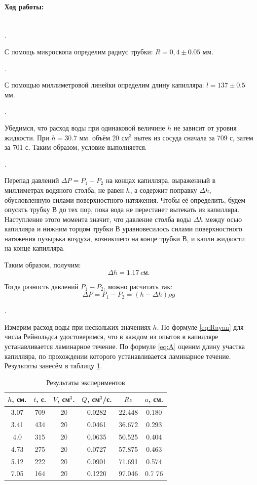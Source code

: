 \documentclass[a4paper, 12pt]{article}
\newcommand{\parag}[1]{\paragraph*{#1:}}
\newcounter{Points}
\newcommand{\point}{\arabic{Points}. \addtocounter{Points}{1}}
\begin{document}
\parag {Ход работы} ~\\

\point С помощь микроскопа определим радиус трубки: $R = 0,4 \pm 0.05$ мм.

\point С помощью миллиметровой линейки определим длину капилляра: $l = 137 \pm 0.5$ мм.

\point Убедимся, что расход воды при одинаковой величине $h$ не зависит от уровня жидкости. При $h = 30.7$ мм. объём 20 см$^3$ вытек из сосуда сначала за 709 с, затем за 701 с. Таким образом, условие выполняется.

\point Перепад давлений $\Delta P = P_1 - P_2$ на концах капилляра, выраженный в миллиметрах водяного столба, не равен $h$, а содержит поправку $\Delta h$, обусловленную силами поверхностного натяжения. Чтобы её определить, будем опускть трубку $В$ до тех пор, пока вода не перестанет вытекать из капилляра. Наступление этого момента значит, что давление столба воды $\Delta h$ между осью капилляра и нижним торцом трубки $В$ уравновесилось силами поверхностного натяжения пузырька воздуха, возникшего на конце трубки $В$, и капли жидкости на конце капилляра.

Таким образом, получим:
\begin{equation*}
    \Delta h = 1.17~cм.
\end{equation*}

Тогда разность давлений $P_1 - P_2$, можно расчитать так:
\begin{equation}
    \Delta P = P_1 - P_2 = (h - \Delta h)\rho g
    \label{deltaP}
\end{equation}

\point Измерим расход воды при нескольких значениях $h$. По формуле \ref{eq:Rayan} для числа Рейнольдса удостоверимся, что в каждом из опытов в капилляре устанавливается ламинарное течение. По формуле \ref{eq:A} оценим длину участка капилляра, по прохождении которого устанавливается ламинарное течение.  Результаты занесём в таблицу \ref{tabl:data}. 

\begin{table}[h]
    \centering
    \begin{tabular}{|c|c|c|c|c|c|}
    \hline 
    $h$, см.&   $t$, с. &   $V$, см$^3$.& $Q$, см$^3$/с.&   $Re$    &   $a$, см.    \\ \hline
    3.07	&	709	    &	20	        &	0.0282	    &	22.448	&	0.180	    \\
    3.41	&	434	    &	20	        &	0.0461	    &	36.672	&	0.293	    \\
    4.0	    &	315	    &	20	        &	0.0635	    &	50.525	&	0.404	    \\
    4.73	&	275	    &	20	        &	0.0727	    &	57.875	&	0.463	    \\
    5.12	&	222	    &	20	        &	0.0901	    &	71.691	&	0.574	    \\
    7.05	&	164	    &	20	        &	0.1220	    &	97.046	&	0.7 76	    \\ \hline
    \end{tabular}
	\caption{Результаты экспериментов}
    \label{tabl:data}
\end{table}
\end{document}
